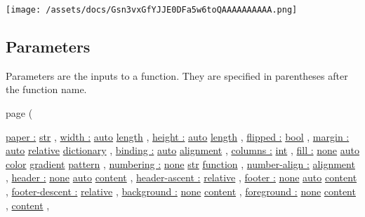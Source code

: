 \texttt{[image: /assets/docs/Gsn3vxGfYJJE0DFa5w6toQAAAAAAAAAA.png]}

\subsection{\texorpdfstring{{ Parameters
}}{ Parameters }}\label{parameters}

\label{parameters-tooltip}
Parameters are the inputs to a function. They are specified in
parentheses after the function name.

{ page } (

{ \hyperref[parameters-paper]{paper :}
\href{/docs/reference/foundations/str/}{str} , } {
\hyperref[parameters-width]{width :}
\href{/docs/reference/foundations/auto/}{auto}
\href{/docs/reference/layout/length/}{length} , } {
\hyperref[parameters-height]{height :}
\href{/docs/reference/foundations/auto/}{auto}
\href{/docs/reference/layout/length/}{length} , } {
\hyperref[parameters-flipped]{flipped :}
\href{/docs/reference/foundations/bool/}{bool} , } {
\hyperref[parameters-margin]{margin :}
\href{/docs/reference/foundations/auto/}{auto}
\href{/docs/reference/layout/relative/}{relative}
\href{/docs/reference/foundations/dictionary/}{dictionary} , } {
\hyperref[parameters-binding]{binding :}
\href{/docs/reference/foundations/auto/}{auto}
\href{/docs/reference/layout/alignment/}{alignment} , } {
\hyperref[parameters-columns]{columns :}
\href{/docs/reference/foundations/int/}{int} , } {
\hyperref[parameters-fill]{fill :}
\href{/docs/reference/foundations/none/}{none}
\href{/docs/reference/foundations/auto/}{auto}
\href{/docs/reference/visualize/color/}{color}
\href{/docs/reference/visualize/gradient/}{gradient}
\href{/docs/reference/visualize/pattern/}{pattern} , } {
\hyperref[parameters-numbering]{numbering :}
\href{/docs/reference/foundations/none/}{none}
\href{/docs/reference/foundations/str/}{str}
\href{/docs/reference/foundations/function/}{function} , } {
\hyperref[parameters-number-align]{number-align :}
\href{/docs/reference/layout/alignment/}{alignment} , } {
\hyperref[parameters-header]{header :}
\href{/docs/reference/foundations/none/}{none}
\href{/docs/reference/foundations/auto/}{auto}
\href{/docs/reference/foundations/content/}{content} , } {
\hyperref[parameters-header-ascent]{header-ascent :}
\href{/docs/reference/layout/relative/}{relative} , } {
\hyperref[parameters-footer]{footer :}
\href{/docs/reference/foundations/none/}{none}
\href{/docs/reference/foundations/auto/}{auto}
\href{/docs/reference/foundations/content/}{content} , } {
\hyperref[parameters-footer-descent]{footer-descent :}
\href{/docs/reference/layout/relative/}{relative} , } {
\hyperref[parameters-background]{background :}
\href{/docs/reference/foundations/none/}{none}
\href{/docs/reference/foundations/content/}{content} , } {
\hyperref[parameters-foreground]{foreground :}
\href{/docs/reference/foundations/none/}{none}
\href{/docs/reference/foundations/content/}{content} , } {
\href{/docs/reference/foundations/content/}{content} , }

